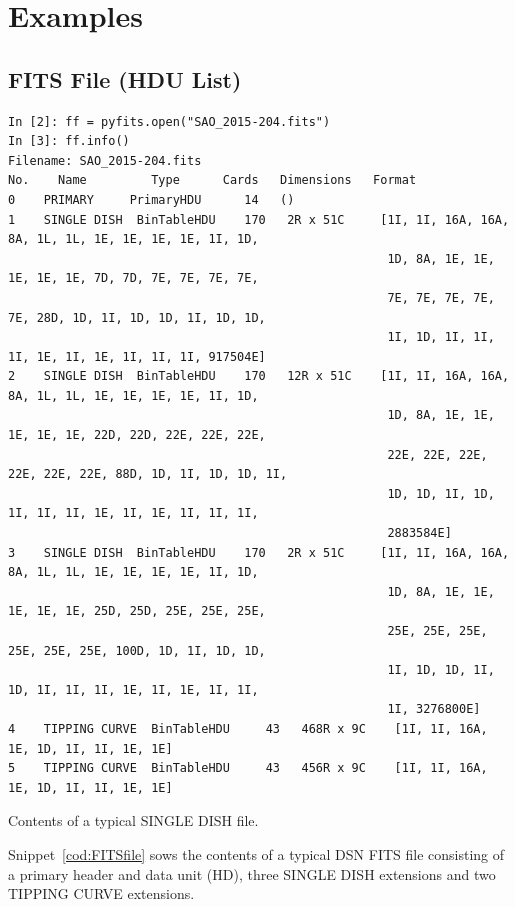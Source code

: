 \documentclass[letterpaper,11pt]{book}
\begin{document}
\section{Examples}

\subsection{FITS File (HDU List)}

\begin{code}[h!tb]
\begin{center}
{\scriptsize \begin{verbatim}
In [2]: ff = pyfits.open("SAO_2015-204.fits")
In [3]: ff.info()
Filename: SAO_2015-204.fits
No.    Name         Type      Cards   Dimensions   Format
0    PRIMARY     PrimaryHDU      14   ()              
1    SINGLE DISH  BinTableHDU    170   2R x 51C     [1I, 1I, 16A, 16A, 8A, 1L, 1L, 1E, 1E, 1E, 1E, 1I, 1D,
                                                     1D, 8A, 1E, 1E, 1E, 1E, 1E, 7D, 7D, 7E, 7E, 7E, 7E,
                                                     7E, 7E, 7E, 7E, 7E, 28D, 1D, 1I, 1D, 1D, 1I, 1D, 1D,
                                                     1I, 1D, 1I, 1I, 1I, 1E, 1I, 1E, 1I, 1I, 1I, 917504E]   
2    SINGLE DISH  BinTableHDU    170   12R x 51C    [1I, 1I, 16A, 16A, 8A, 1L, 1L, 1E, 1E, 1E, 1E, 1I, 1D,
                                                     1D, 8A, 1E, 1E, 1E, 1E, 1E, 22D, 22D, 22E, 22E, 22E,
                                                     22E, 22E, 22E, 22E, 22E, 22E, 88D, 1D, 1I, 1D, 1D, 1I,
                                                     1D, 1D, 1I, 1D, 1I, 1I, 1I, 1E, 1I, 1E, 1I, 1I, 1I,
                                                     2883584E]   
3    SINGLE DISH  BinTableHDU    170   2R x 51C     [1I, 1I, 16A, 16A, 8A, 1L, 1L, 1E, 1E, 1E, 1E, 1I, 1D,
                                                     1D, 8A, 1E, 1E, 1E, 1E, 1E, 25D, 25D, 25E, 25E, 25E,
                                                     25E, 25E, 25E, 25E, 25E, 25E, 100D, 1D, 1I, 1D, 1D,
                                                     1I, 1D, 1D, 1I, 1D, 1I, 1I, 1I, 1E, 1I, 1E, 1I, 1I,
                                                     1I, 3276800E]   
4    TIPPING CURVE  BinTableHDU     43   468R x 9C    [1I, 1I, 16A, 1E, 1D, 1I, 1I, 1E, 1E]   
5    TIPPING CURVE  BinTableHDU     43   456R x 9C    [1I, 1I, 16A, 1E, 1D, 1I, 1I, 1E, 1E] \end{verbatim}  
}\caption{\label{cod:FITSfile}Contents of a typical SINGLE DISH file.}
\end{center}
\end{code}
Snippet~\ref{cod:FITSfile} sows the contents of a typical DSN FITS file 
consisting of a primary header and data unit (HD), three SINGLE DISH extensions
and two TIPPING CURVE extensions.
\end{document}
